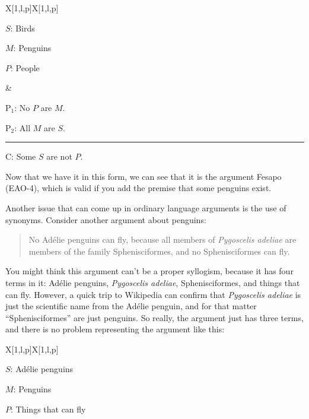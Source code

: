 {\begin{tabu}{{X[1,l,p]X[1,l,p]}}


\begin{ekey}
\item[$S$:] Birds
\item[$M$:] Penguins
\item[$P$:] People
\end{ekey}

&

\begin{earg}
\item[P$_1$:] No $P$ are $M$. 
\item[P$_2$:] All $M$ are $S$.
\vspace{-.5em}
\item [] \rule{0.4\linewidth}{.5pt} 
\item[C:] Some $S$ are not $P$.
\end{earg} 

\end{tabu}

Now that we have it in this form, we can see that it is the argument Fesapo (EAO-4), which is valid if you add the premise that some penguins exist.

Another issue that can come up in ordinary language arguments is the use of synonyms. Consider another argument about penguins:

\begin{quotation}
\noindent No Ad\'{e}lie penguins can fly, because all members of \emph{Pygoscelis adeliae} are members of the family Sphenisciformes, and no Sphenisciformes can fly.
\end{quotation}

You might think this argument can't be a proper syllogism, because it has four terms in it: Ad\'{e}lie penguins, \emph{Pygoscelis adeliae}, Sphenisciformes, and things that can fly. However, a quick trip to Wikipedia can confirm that \emph{Pygoscelis adeliae} is just the scientific name from the Ad\'{e}lie penguin, and for that matter ``Sphenisciformes'' are just penguins. So really, the argument just has three terms, and there is no problem representing the argument  like this:

\begin{tabu}{{X[1,l,p]X[1,l,p]}}


\begin{ekey}
\item[$S$:] Ad\'{e}lie penguins
\item[$M$:] Penguins
\item[$P$:] Things that can fly 
\end{ekey}


\end{tabu}}
